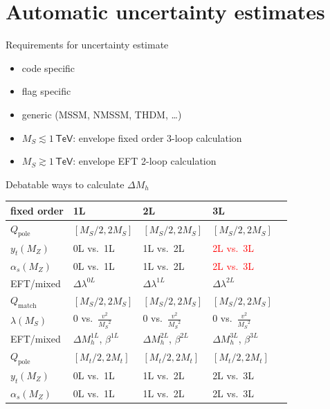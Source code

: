 \documentclass[hyperref={pdfpagelabels=false},ngerman]{beamer}
\newcommand{\eh}[1]{\,\mathsf{#1}}
\newcommand{\MS}{\ensuremath{M_S}}
\newcommand{\pole}{\ensuremath{\text{pole}}}
\begin{document}

\section{Automatic uncertainty estimates}

\begin{frame}{Requirements for uncertainty estimate}
  \begin{itemize}
  \item code specific
  \item flag specific
  \item generic (MSSM, NMSSM, THDM, \ldots)
  \item $\MS \lesssim 1\eh{TeV}$: envelope fixed order 3-loop calculation
  \item $\MS \gtrsim 1\eh{TeV}$: envelope EFT 2-loop calculation
  \end{itemize}
\end{frame}

\begin{frame}{Debatable ways to calculate $\Delta M_h$}
  \begin{center}
  \begin{tabular}{lllll}
    \toprule
    fixed order & 1L & 2L & 3L \\
    \midrule
    $Q_\pole$ & $[\MS/2, 2\MS]$ & $[\MS/2, 2\MS]$ & $[\MS/2, 2\MS]$ \\
    $y_t(M_Z)$ & 0L vs.\ 1L & 1L vs.\ 2L & \textcolor{red}{2L vs.\ 3L} \\
    $\alpha_s(M_Z)$ & 0L vs.\ 1L & 1L vs.\ 2L & \textcolor{red}{2L vs.\ 3L} \\
    \midrule
    EFT/mixed & $\Delta\lambda^{0L}$ & $\Delta\lambda^{1L}$ & $\Delta\lambda^{2L}$ \\
    \midrule
    $Q_\text{match}$ & $[\MS/2, 2\MS]$ & $[\MS/2, 2\MS]$ & $[\MS/2, 2\MS]$ \\
    $\lambda(\MS)$ & $0$ vs.\ $\frac{v^2}{\MS^2}$ & $0$ vs.\ $\frac{v^2}{\MS^2}$ & $0$ vs.\ $\frac{v^2}{\MS^2}$ \\
    \midrule
    EFT/mixed & $\Delta M_h^{1L}$, $\beta^{1L}$ & $\Delta M_h^{2L}$, $\beta^{2L}$ & $\Delta M_h^{3L}$, $\beta^{3L}$ \\
    \midrule
    $Q_\pole$ & $[M_t/2, 2M_t]$ & $[M_t/2, 2M_t]$ & $[M_t/2, 2M_t]$ \\
    $y_t(M_Z)$ & 0L vs.\ 1L & 1L vs.\ 2L & 2L vs.\ 3L \\
    $\alpha_s(M_Z)$ & 0L vs.\ 1L & 1L vs.\ 2L & 2L vs.\ 3L \\
    \bottomrule
  \end{tabular}
\end{center}
\end{frame}
\end{document}
